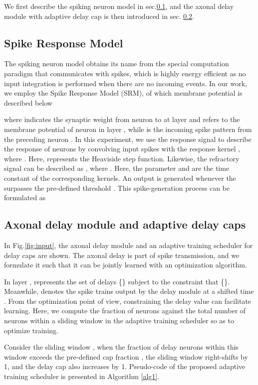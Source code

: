 \documentclass{article}
\begin{document}
We first describe the spiking neuron model in sec.\ref{sec:1}, and the axonal delay module with adaptive delay cap is then introduced in sec. \ref{sec:2}.    

\subsection{Spike Response Model}\label{sec:1}
The spiking neuron model obtains its name from the special computation paradigm that communicates with spikes, which is highly energy efficient as no input integration is performed when there are no incoming events. In our work, we employ the Spike Response Model (SRM), of which membrane potential is described below

where  indicates the synaptic weight from neuron  to  at layer  and  refers to the membrane potential of neuron  in layer , while  is the incoming spike pattern from the preceding neuron . In this experiment, we use the response signal  to describe the response of neurons by convolving input spikes  with the response kernel , where . Here,  represents the Heaviside step function. Likewise, the refractory signal can be described as , where . Here, the parameter  and  are the time constant of the corresponding kernels. 
An output is generated whenever the  surpasses the pre-defined threshold . This spike-generation process can be formulated as







\subsection{Axonal delay module and adaptive delay caps}\label{sec:2}
In Fig.\ref{fig:input}, the axonal delay module and an adaptive training scheduler for delay caps are shown. The axonal delay is part of spike transmission, and we formulate it such that it can be jointly learned  with an optimization algorithm. 

In layer ,  represents the set of delays \{\} subject to the constraint that \{\}. Meanwhile,  denotes the spike trains output by the delay module at a shifted time . From the optimization point of view, constraining the delay value can facilitate learning. Here, we compute the fraction of neurons against the total number of neurons within a sliding window \cite{niu2019comparison} in the adaptive training scheduler so as to optimize training. 

Consider the sliding window , when the fraction of delay neurons within this window exceeds the pre-defined cap fraction , the sliding window right-shifts by 1, and the delay cap  also increases by 1. Pseudo-code of the proposed adaptive training scheduler is presented in Algorithm \ref{alg1}. 
\end{document}
